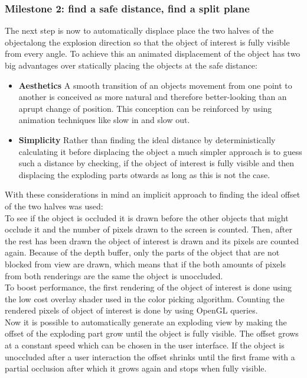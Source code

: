 \subsubsection{Milestone 2: find a safe distance, find a split plane} 
The next step is now to automatically displace place the two halves of the objectalong the explosion direction so that the object of interest is fully visible from every angle. To achieve this an animated displacement of the object has two big advantages over statically placing the objects at the safe distance:\\
\begin{itemize}
\item \textbf{Aesthetics} A smooth transition of an objects movement from one point to another is conceived as more natural and therefore better-looking than an aprupt change of position. This conception can be reinforced by using animation techniques like slow in and slow out.\cite{misc:siggraph}
\item \textbf{Simplicity} Rather than finding the ideal distance by deterministically calculating it before displacing the object a much simpler approach is to guess such a distance by checking, if the object of interest is fully visible and then displacing the exploding parts otwards as long as this is not the case.
\end{itemize}
With these considerations in mind an implicit approach to finding the ideal offset of the two halves was used:\\
To see if the object is occluded it is drawn before the other objects that might occlude it and the number of pixels drawn to the screen is counted. Then, after the rest has been drawn the object of interest is drawn and its pixels are counted again. Because of the depth buffer, only the parts of the object that are not blocked from view are drawn, which means that if the both amounts of pixels from both renderings are the same the object is unoccluded.\\
To boost performance, the first rendering of the object of interest is done using the low cost overlay shader used in the color picking algorithm. Counting the rendered pixels of object of interest is done by using OpenGL queries. \\
Now it is possible to automatically generate an exploding view by making the offset of the exploding part grow until the object is fully visible. The offset grows at a constant speed which can be chosen in the user interface. If the object is unoccluded after a user interaction the offset shrinks until the first frame with a partial occlusion after which it grows again and stops when fully visible.\\ 
